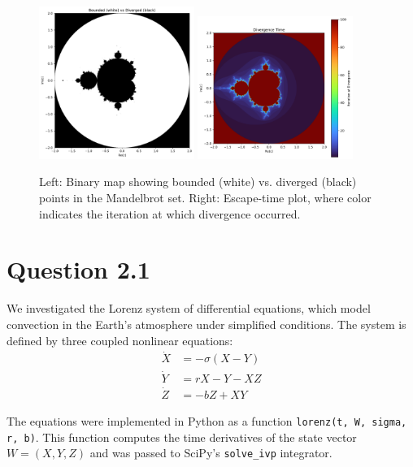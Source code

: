 \documentclass[11pt]{article}
\begin{document}
\begin{figure}[H]
    \centering
    \includegraphics[width=0.45\textwidth]{fig1a.pdf}
    \hfill
    \includegraphics[width=0.45\textwidth]{fig1b.pdf}
    \caption{Left: Binary map showing bounded (white) vs. diverged (black) points in the Mandelbrot set. 
    Right: Escape-time plot, where color indicates the iteration at which divergence occurred.}
\end{figure}

\section*{Question 2.1}

We investigated the Lorenz system of differential equations, which model convection in the Earth's atmosphere under simplified conditions. The system is defined by three coupled nonlinear equations:
\[
\begin{aligned}
\dot{X} &= -\sigma (X - Y) \\
\dot{Y} &= rX - Y - XZ \\
\dot{Z} &= -bZ + XY
\end{aligned}
\]

The equations were implemented in Python as a function \texttt{lorenz(t, W, sigma, r, b)}. This function computes the time derivatives of the state vector $W = (X, Y, Z)$ and was passed to SciPy's \texttt{solve\_ivp} integrator. 
\end{document}
